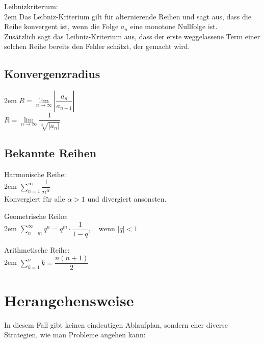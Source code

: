 \documentclass[11pt,final]{scrreprt}
\begin{document}
Leibnizkriterium:\\

\begingroup
\leftskip2em 
Das Leibniz-Kriterium gilt für alternierende Reihen und sagt aus, dass die Reihe konvergent ist, wenn die Folge $a_n$ eine monotone Nullfolge ist.\\
Zusätzlich sagt das Leibniz-Kriterium aus, dass der erste weggelassene Term einer solchen Reihe bereits den Fehler schätzt, der gemacht wird.
\par	
\endgroup 

\subsection*{Konvergenzradius}

\begingroup
\leftskip2em 
$ R = \lim\limits_{n\to\infty} \left| \dfrac{a_n}{a_{n+1}} \right|$\\
$ R = \lim\limits_{n\to\infty} \dfrac{1}{\sqrt[n]{|a_n|}}$\\
\par	
\endgroup 

\subsection*{Bekannte Reihen}

Harmonische Reihe:\\

\begingroup
\leftskip2em 
$ \sum\limits_{n=1}^{\infty} \dfrac{1}{n^\alpha}$\\
Konvergiert für alle $\alpha>1$ und divergiert ansonsten.\\
\par	
\endgroup

Geometrische Reihe:\\

\begingroup
\leftskip2em 
$ \sum\limits_{n=m}^{\infty} q^n = q^m \cdot \dfrac{1}{1-q}, \hspace{1em}\text{wenn  }|q|<1$\\
\par	
\endgroup  

Arithmetische Reihe:\\

\begingroup
\leftskip2em 
$ \sum\limits_{k=1}^{n} k = \dfrac{n(n+1)}{2}$\\
\par	
\endgroup 

\section{Herangehensweise}
In diesem Fall gibt keinen eindeutigen Ablaufplan, sondern eher diverse Strategien, wie man Probleme angehen kann: 
\end{document}
